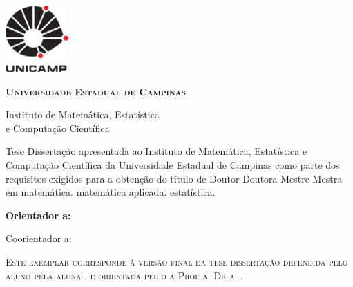 \thispagestyle{plain}
\includegraphics[width=.94in, height=1in,
keepaspectratio=true]{figuras/unicamp-logo}
\begin{center}
  {\large \scshape \bfseries Universidade Estadual de Campinas
  \vspace{.5cm}

  Instituto de Matemática, Estatística \\
  e Computação Científica}
\end{center}
\vfill
\begin{center}
  {\large \scshape \bfseries \autor}
\end{center}
\vfill
\begin{center}
  {\Large \scshape \bfseries \titulo}
\end{center}
\vfill

\begin{flushright}
  \begin{minipage}[c]{.5\textwidth}
    \ifx\mestrado\undefined
    Tese
    \else
    Dissertação
    \fi
    apresentada ao Instituto de Matemática,
    Estatística e Computação Científica da Universidade
    Estadual de Campinas como parte dos requisitos exigidos
    para a obtenção do título de
    \ifx\mestrado\undefined
    \ifx\femaleAuthor\undefined
    Doutor
    \else
    Doutora
    \fi
    \else
    \ifx\femaleAuthor\undefined
    Mestre
    \else
    Mestra
    \fi
    \fi
    em
    \ifx\matematica\undefined
    \else
    matemática.
    \fi
    \ifx\aplicada\undefined
    \else
    matemática aplicada.
    \fi
    \ifx\estatistica\undefined
    \else
    estatística.
    \fi
  \end{minipage}
\end{flushright}
\vspace{.5cm}

\noindent
{\bfseries
\noindent
Orientador\ifx\femaleOrientador\undefined
\else
a\fi: \orientador
\vspace{.25cm}

\ifx\coorientador\undefined
\else
\noindent
Coorientador\ifx\femaleCoorientador\undefined
\else
a\fi: \coorientador
\fi
}
\vspace{.5cm}

\noindent
\begin{minipage}[c]{.5\textwidth}
  \noindent
  {\footnotesize \scshape
  Este exemplar corresponde à versão final da
  \ifx\mestrado\undefined
  tese
  \else
  dissertação
  \fi
  defendida
  \ifx\femaleAuthor\undefined
  pelo aluno
  \else
  pela aluna
  \fi
  \autor,
  e orientada pel\ifx\femaleOrientador\undefined
  o\else
  a\fi{} Prof\ifx\femaleOrientador\undefined
  \else
  a\fi. Dr\ifx\femaleOrientador\undefined
  \else
  a\fi. \orientador.
  }
\end{minipage}
\vspace{1cm}

